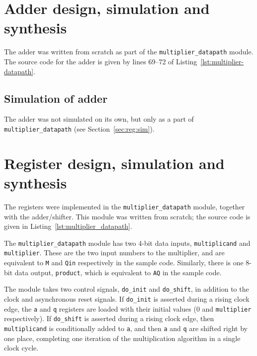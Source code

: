\documentclass[a4paper]{article}
\begin{document}

\section{Adder design, simulation and synthesis}
\label{sec:adder}

The adder was written from scratch as part of the \texttt{multiplier\_datapath} module. The source code for the adder is given by lines 69--72 of Listing~\ref{lst:multiplier-datapath}.

\subsection{Simulation of adder}
\label{sec:adder:sim}

The adder was not simulated on its own, but only as a part of \texttt{multiplier\_datapath} (see Section~\ref{sec:reg:sim}). 

\section{Register design, simulation and synthesis}
\label{seg:reg}

The registers were implemented in the \texttt{multiplier\_datapath} module, together with the adder/shifter. This module was written from scratch; the source code is given in Listing~\ref{lst:multiplier_datapath}.

The \texttt{multiplier\_datapath} module has two 4-bit data inputs, \texttt{multiplicand} and \texttt{multiplier}. These are the two input numbers to the multiplier, and are equivalent to \texttt{M} and \texttt{Qin} respectively in the sample code. Similarly, there is one 8-bit data output, \texttt{product}, which is equivalent to \texttt{AQ} in the sample code.

The module takes two control signals, \texttt{do\_init} and \texttt{do\_shift}, in addition to the clock and asynchronous reset signals. If \texttt{do\_init} is asserted during a rising clock edge, the \texttt{a} and \texttt{q} registers are loaded with their initial values (0 and \texttt{multiplier} respectively). If \texttt{do\_shift} is asserted during a rising clock edge, then \texttt{multiplicand} is conditionally added to \texttt{a}, and then \texttt{a} and \texttt{q} are shifted right by one place, completing one iteration of the multiplication algorithm in a single clock cycle.
\end{document}
